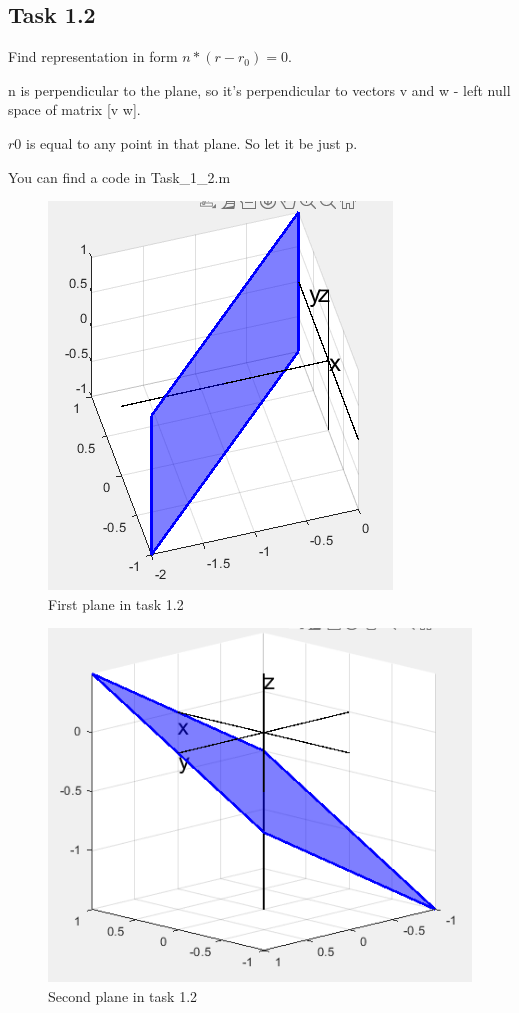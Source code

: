 \documentclass[12pt]{article}
\begin{document}
\subsection{Task 1.2}
Find representation in form $n*(r-r_0) = 0$.  

n is perpendicular to the plane, so it's perpendicular to vectors v and w - left null space of matrix [v w].  

$r0$ is equal to any point in that plane. So let it be just p. 

You can find a code in Task\string_1\string_2.m

\begin{figure}[h]
    \centering
    \includegraphics[scale=0.5]{Task_1_21.png}
    \caption{First plane in task 1.2}
    \label{fig:my_label}
\end{figure}

\begin{figure}[h]
    \centering
    \includegraphics[scale=0.5]{Task_1_22.png}
    \caption{Second plane in task 1.2}
    \label{fig:my_label}
\end{figure}
\end{document}
